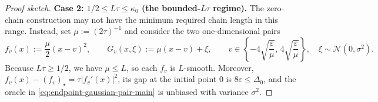 \documentclass[11pt]{article}
\newcommand{\abs}[1]{\left\lvert #1\right\rvert}
\begin{document}
\begin{proof}[Proof sketch]
\textbf{Case 2: $1/2\le L\tau\le\kappa_0$ (the bounded-$L\tau$ regime).}
The zero-chain construction may not have the minimum required chain length in this range. Instead, set
$\mu:=(2\tau)^{-1}$ and consider the two one-dimensional pairs
\begin{equation}
\label{eq:endpoint-gaussian-pair-main}
f_v(x):=\frac{\mu}{2}(x-v)^2,
\qquad
G_v(x,\xi):=\mu(x-v)+\xi,
\qquad
v\in\left\{-4\sqrt{\frac{\varepsilon}{\mu}},\,
4\sqrt{\frac{\varepsilon}{\mu}}\right\},
\quad \xi\sim\mathcal N(0,\sigma^2).
\end{equation}
Because $L\tau\ge1/2$, we have $\mu\le L$, so each $f_v$ is $L$-smooth. Moreover,
$f_v(x)-(f_v)_\star=\tau\abs{f_v'(x)}^2$, its gap at the initial point $0$ is
$8\varepsilon\le\Delta_0$, and the oracle in
\eqref{eq:endpoint-gaussian-pair-main} is unbiased with variance $\sigma^2$.


\end{proof}
\end{document}
